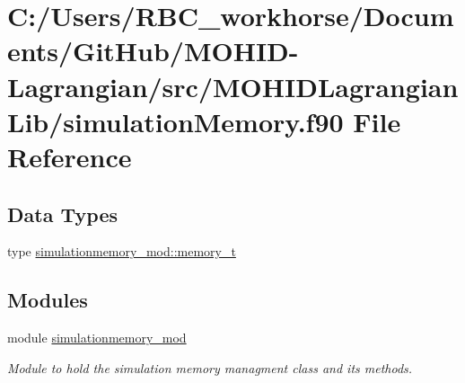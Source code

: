 \hypertarget{simulation_memory_8f90}{}\section{C\+:/\+Users/\+R\+B\+C\+\_\+workhorse/\+Documents/\+Git\+Hub/\+M\+O\+H\+I\+D-\/\+Lagrangian/src/\+M\+O\+H\+I\+D\+Lagrangian\+Lib/simulation\+Memory.f90 File Reference}
\label{simulation_memory_8f90}
\subsection*{Data Types}
\begin{DoxyCompactItemize}
\item 
type \mbox{\hyperlink{structsimulationmemory__mod_1_1memory__t}{simulationmemory\+\_\+mod\+::memory\+\_\+t}}
\end{DoxyCompactItemize}
\subsection*{Modules}
\begin{DoxyCompactItemize}
\item 
module \mbox{\hyperlink{namespacesimulationmemory__mod}{simulationmemory\+\_\+mod}}
\begin{DoxyCompactList}\small\item\em Module to hold the simulation memory managment class and its methods. \end{DoxyCompactList}\end{DoxyCompactItemize}
